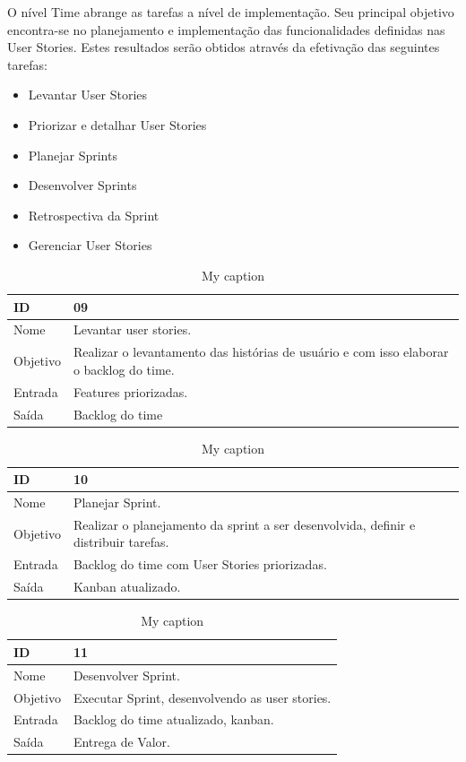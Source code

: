 O nível Time abrange as tarefas a nível de implementação. Seu principal objetivo encontra-se no planejamento e implementação das funcionalidades definidas nas User Stories.  Estes resultados serão obtidos através da efetivação das seguintes tarefas:

\begin{itemize}
\item Levantar User Stories
\item Priorizar e detalhar User Stories
\item Planejar Sprints
\item Desenvolver Sprints
\item Retrospectiva da Sprint
\item Gerenciar User Stories
\end{itemize}

\begin{table}[\htp]
\centering
\caption{My caption}
\label{my-label}
\begin{tabular}{|l|l|}
\hline
ID       & 09                                             \\ \hline
Nome     & Levantar user stories. \\ \hline
Objetivo & Realizar o levantamento das histórias de usuário e com isso elaborar o backlog do time.
 \\ \hline
Entrada  &  Features priorizadas. \\ \hline
Saída    &  Backlog do time \\ \hline
\end{tabular}
\end{table}

\begin{table}[\htp]
\centering
\caption{My caption}
\label{my-label}
\begin{tabular}{|l|l|}
\hline
ID       & 10                                             \\ \hline
Nome     & Planejar Sprint. \\ \hline
Objetivo & Realizar o planejamento da sprint a ser desenvolvida, definir e distribuir tarefas.
 \\ \hline
Entrada  &  Backlog do time com User Stories priorizadas. \\ \hline
Saída    &  Kanban atualizado.\\ \hline
\end{tabular}
\end{table}

\begin{table}[\htp]
\centering
\caption{My caption}
\label{my-label}
\begin{tabular}{|l|l|}
\hline
ID       & 11                                            \\ \hline
Nome     & Desenvolver Sprint. \\ \hline
Objetivo & Executar Sprint, desenvolvendo as user stories.
 \\ \hline
Entrada  & Backlog do time atualizado, kanban. \\ \hline
Saída    &  Entrega de Valor.\\ \hline
\end{tabular}
\end{table}

